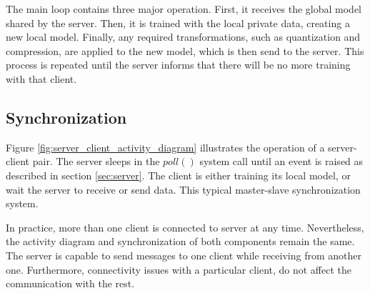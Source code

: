 The main loop contains three major operation. First, it receives the global model shared by the server. Then, it is trained with the local private data, creating a new local model. Finally, any required transformations, such as quantization and compression, are applied to the new model, which is then send to the server. This process is repeated until the server informs that there will be no more training with that client.

\subsection{Synchronization}
Figure \ref{fig:server_client_activity_diagram} illustrates the operation of a server-client pair. The server sleeps in the \(poll()\) system call until an event is raised as described in section \ref{sec:server}. The client is either training its local model, or wait the server to receive or send data. This typical master-slave synchronization system.

In practice, more than one client is connected to server at any time. Nevertheless, the activity diagram and synchronization of both components remain the same. The server is capable to send messages to one client while receiving from another one. Furthermore, connectivity issues with a particular client, do not affect the communication with the rest.


